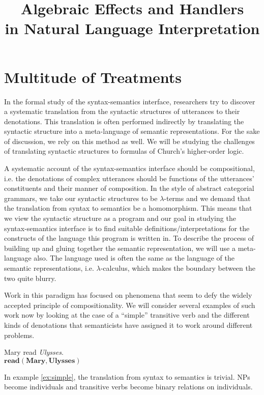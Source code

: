 \documentclass{article}
\title{Algebraic Effects and Handlers \\ in Natural Language Interpretation}
\begin{document}
\maketitle

\section{Multitude of Treatments}

In the formal study of the syntax-semantics interface, researchers try to
discover a systematic translation from the syntactic structures of utterances
to their denotations. This translation is often performed indirectly by
translating the syntactic structure into a meta-language of semantic
representations. For the sake of discussion, we rely on this method as
well. We will be studying the challenges of translating syntactic structures
to formulas of Church's higher-order logic.

A systematic account of the syntax-semantics interface should be
compositional, i.e. the denotations of complex utterances should be functions
of the utterances' constituents and their manner of composition. In the style
of abstract categorial grammars, we take our syntactic structures to be
$\lambda$-terms and we demand that the translation from syntax to semantics be
a homomorphism. This means that we view the syntactic structure as a program
and our goal in studying the syntax-semantics interface is to find suitable
definitions/interpretations for the constructs of the language this program is
written in. To describe the process of building up and gluing together the
semantic representation, we will use a meta-language also. The language used
is often the same as the language of the semantic representations,
i.e. $\lambda$-calculus, which makes the boundary between the two quite
blurry.

Work in this paradigm has focused on phenomena that seem to defy the widely
accepted principle of compositionality. We will consider several examples of
such work now by looking at the case of a ``simple'' transitive verb and the
different kinds of denotations that semanticists have assigned it to work
around different problems.

\begin{exe}
  \ex \label{ex:simple} Mary read \emph{Ulysses}. \\
  $\textbf{read}(\textbf{Mary}, \textbf{Ulysses})$
\end{exe}

In example \eqref{ex:simple}, the translation from syntax to semantics is
trivial. NPs become individuals and transitive verbs become binary relations
on individuals.
\end{document}
